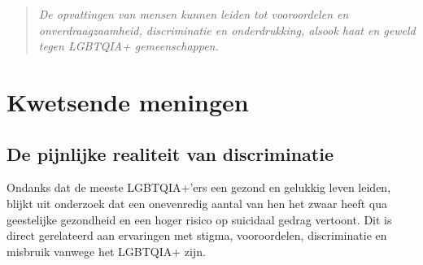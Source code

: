 \documentclass[12pt,openany]{book}
\begin{document}
\begin{figure}[h]
    \centering
\end{figure}

\begin{quote}
\centering
\textit{\Large De opvattingen van mensen kunnen leiden tot vooroordelen en onverdraagzaamheid, discriminatie en onderdrukking, alsook haat en geweld tegen LGBTQIA+ gemeenschappen.}
\end{quote}

\chapter*{Kwetsende meningen}

\section*{De pijnlijke realiteit van discriminatie}

Ondanks dat de meeste LGBTQIA+’ers een gezond en gelukkig leven leiden, blijkt uit onderzoek dat een onevenredig aantal van hen het zwaar heeft qua geestelijke gezondheid en een hoger risico op suicidaal gedrag vertoont. Dit is direct gerelateerd aan ervaringen met stigma, vooroordelen, discriminatie en misbruik vanwege het LGBTQIA+ zijn. 
\end{document}
